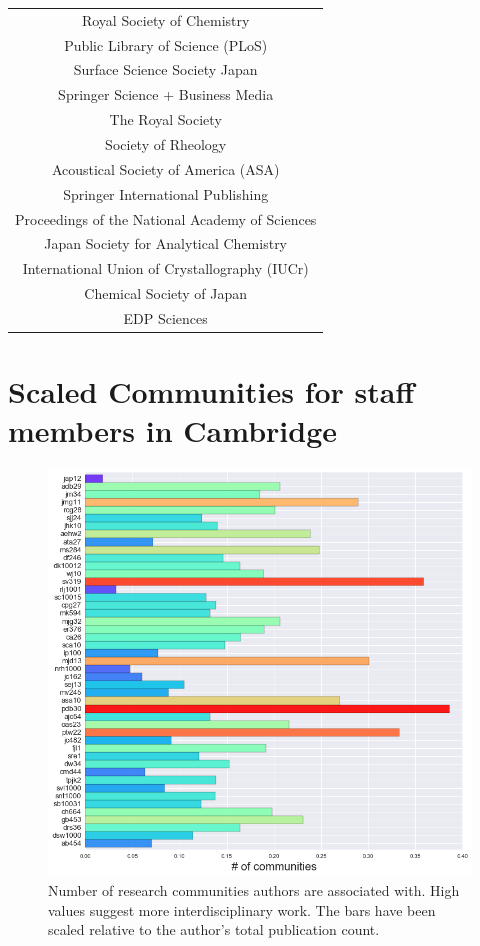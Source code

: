 \begin{table}[H]
\begin{tabular}{||c||}
Royal Society of Chemistry                        \\
Public Library of Science (PLoS)                  \\
Surface Science Society Japan                     \\
Springer Science + Business Media                 \\
The Royal Society                                 \\
Society of Rheology                               \\
Acoustical Society of America (ASA)               \\
Springer International Publishing                 \\
Proceedings of the National Academy of Sciences   \\
Japan Society for Analytical Chemistry            \\
International Union of Crystallography (IUCr)     \\
Chemical Society of Japan                         \\
EDP Sciences                                      \\
\hline
\end{tabular}
\end{table}
\section{Scaled Communities for staff members in Cambridge}
\begin{center}
\begin{figure}[H]
\label{fig:LABELLEDDENDRO}
  \centering
    \includegraphics[width=\textwidth]{Analysis/community_detection2.png}
    \caption{Number of research communities authors are associated with. High values suggest more interdisciplinary work. The bars have been scaled relative to the author's total publication count. }
\end{figure} 
\end{center}